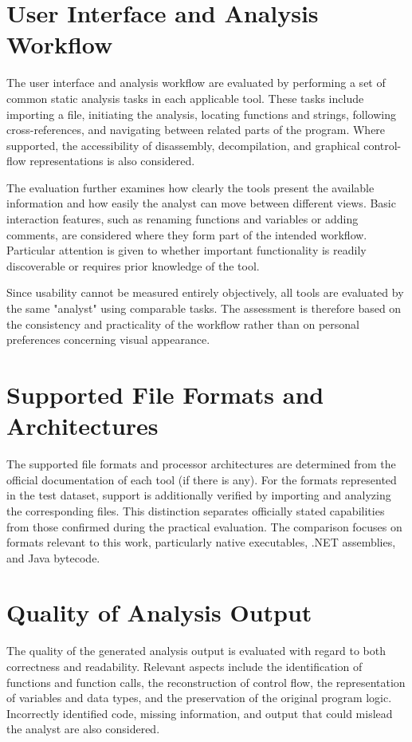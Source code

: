 \section{User Interface and Analysis Workflow}
\label{sec:evaluation:uiux}
The user interface and analysis workflow are evaluated by performing a set of common static analysis tasks in each applicable tool. These tasks include importing a file, 
initiating the analysis, locating functions and strings, following cross-references, and navigating between related parts of the program. Where supported, 
the accessibility of disassembly, decompilation, and graphical control-flow representations is also considered.

The evaluation further examines how clearly the tools present the available information and how easily the analyst can move between different views. Basic interaction features, 
such as renaming functions and variables or adding comments, are considered where they form part of the intended workflow. Particular attention is given to whether important functionality 
is readily discoverable or requires prior knowledge of the tool.

Since usability cannot be measured entirely objectively, all tools are evaluated by the same "analyst" using comparable tasks. The assessment is therefore based on the consistency and 
practicality of the workflow rather than on personal preferences concerning visual appearance.

\section{Supported File Formats and Architectures}
\label{sec:evaluation:fileFormats}
The supported file formats and processor architectures are determined from the official documentation of each tool (if there is any). For the formats represented in the test dataset, 
support is additionally verified by importing and analyzing the corresponding files. This distinction separates officially stated capabilities from those confirmed during the 
practical evaluation. The comparison focuses on formats relevant to this work, particularly native executables, .NET assemblies, and Java bytecode.

\section{Quality of Analysis Output}
\label{sec:evaluation:output}
The quality of the generated analysis output is evaluated with regard to both correctness and readability. Relevant aspects include the identification of functions and function calls, 
the reconstruction of control flow, the representation of variables and data types, and the preservation of the original program logic. Incorrectly identified code, missing information, 
and output that could mislead the analyst are also considered.

